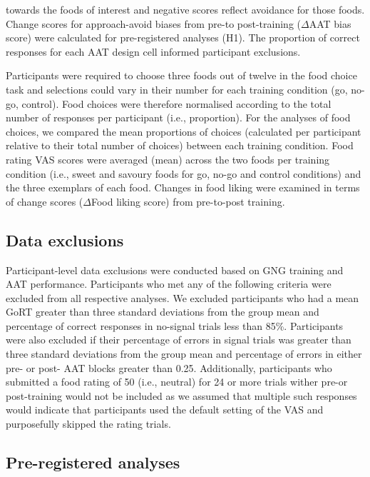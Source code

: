 \documentclass[man,floatsintext]{apa6}
\begin{document}
towards the foods of interest and negative scores reflect avoidance for
those foods. Change scores for approach-avoid biases from pre-to
post-training (\(\Delta\)AAT bias score) were calculated for
pre-registered analyses (H1). The proportion of correct responses for
each AAT design cell informed participant exclusions. \par
Participants were required to choose three foods out of twelve in the
food choice task and selections could vary in their number for each
training condition (go, no-go, control). Food choices were therefore
normalised according to the total number of responses per participant
(i.e., proportion). For the analyses of food choices, we compared the
mean proportions of choices (calculated per participant relative to
their total number of choices) between each training condition. Food
rating VAS scores were averaged (mean) across the two foods per training
condition (i.e., sweet and savoury foods for go, no-go and control
conditions) and the three exemplars of each food. Changes in food liking
were examined in terms of change scores (\(\Delta\)Food liking score)
from pre-to-post training.

\subsection{Data exclusions}\label{data_exclusions}

\par

Participant-level data exclusions were conducted based on GNG training
and AAT performance. Participants who met any of the following criteria
were excluded from all respective analyses. We excluded participants who
had a mean GoRT greater than three standard deviations from the group
mean and percentage of correct responses in no-signal trials less than
85\%. Participants were also excluded if their percentage of errors in
signal trials was greater than three standard deviations from the group
mean and percentage of errors in either pre- or post- AAT blocks greater
than 0.25. Additionally, participants who submitted a food rating of 50
(i.e., neutral) for 24 or more trials wither pre-or post-training would
not be included as we assumed that multiple such responses would
indicate that participants used the default setting of the VAS and
purposefully skipped the rating trials.

\subsection{Pre-registered analyses}\label{prereg_analyses}
\end{document}
